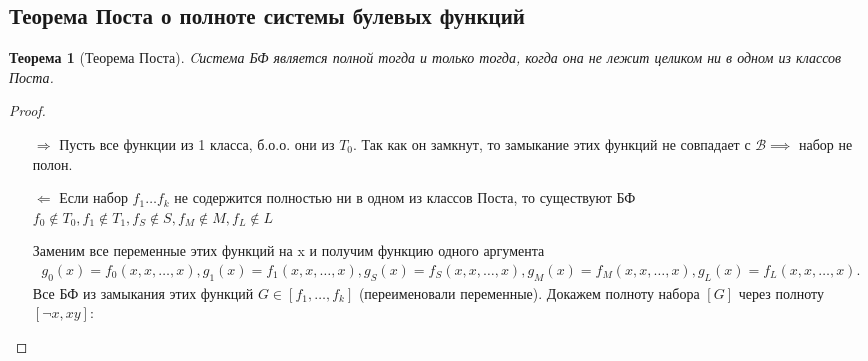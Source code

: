 \documentclass[a4paper]{article}
\newtheorem{theorem}{Теорема}[section]
\theoremstyle{definition}
\theoremstyle{remark}
\begin{document}
    \subsection{Теорема Поста о полноте системы булевых функций}
    \begin{theorem}[Теорема Поста]
        Cистема БФ является полной тогда и только тогда, когда она не лежит целиком ни в одном из классов Поста.
    \end{theorem}
    \begin{proof}
        $ $\newline
        \begin{itemize}
            \item[$\Rightarrow$] Пусть все функции из 1 класса, б.о.о. они из $T_0.$
            Так как он замкнут, то замыкание этих функций не совпадает с $\mathcal{B}\implies$
            набор не полон.
            \item[$\Leftarrow$] Если набор $f_1 \dots f_k$ не содержится полностью
            ни в одном из классов Поста, то существуют БФ 
            $f_0\notin T_0 , f_1\notin T_1, f_S\notin S, f_M\notin M, f_L\notin L$

            Заменим все переменные этих функций на x и получим функцию одного аргумента
            \begin{align*}
                g_0(x) = f_0(x, x, \dots , x),
                g_1(x) = f_1(x, x, \dots , x),
                g_S(x) = f_S(x, x, \dots , x),
                g_M(x) = f_M(x, x, \dots , x),
                g_L(x) = f_L(x, x, \dots , x).
            \end{align*}
            Все БФ из замыкания этих функций $G \in [f_1, \dots, f_k]$
            (переименовали переменные).
            Докажем полноту набора $[G]$ через полноту $[\neg x, xy]$:
            

\end{itemize}
\end{proof}
\end{document}
